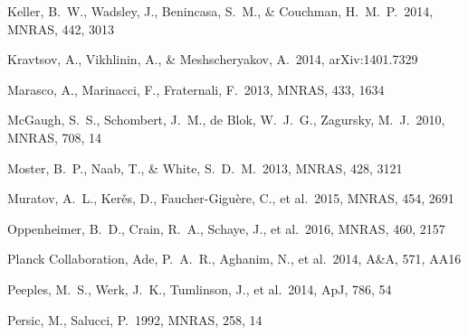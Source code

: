 \documentclass[useAMS,usenatbib]{mn2e}
\def \apj {ApJ}
\def \mnras {MNRAS}
\def \aap {A\&A}
\begin{document}
\begin{thebibliography}{}



 Keller, B.~W., Wadsley, 
  J., Benincasa, S.~M., \& Couchman, H.~M.~P.\ 2014, \mnras, 442, 3013

 Kravtsov, A., 
Vikhlinin, A., \& Meshscheryakov, A.\ 2014, arXiv:1401.7329 

  



Marasco, A., Marinacci, F., Fraternali, F.\ 2013, \mnras, 433, 1634

 McGaugh, S.~S., 
Schombert, J.~M., de Blok, W.~J.~G., Zagursky, M.~J.\ 2010, \mnras,
708, 14

 Moster, B.~P., Naab, T., 
\& White, S.~D.~M.\ 2013, \mnras, 428, 3121 

 Muratov, A.~L., Ker{\v e}s, D., Faucher-Gigu{\`e}re, C., et al.\ 2015, \mnras, 454, 2691




 Oppenheimer, B.~D., Crain, R.~A., Schaye, J., et al.\ 2016, \mnras, 460, 2157 


  Planck Collaboration, Ade, P.~A.~R., Aghanim, N., et al.\ 2014,
  \aap, 571, AA16 
 
 Peeples, M.~S., Werk, J.~K., Tumlinson, J., et al.\ 2014, \apj, 786, 54

 Persic, M., Salucci, P.\ 1992, \mnras, 258, 14


\end{thebibliography}
\end{document}
